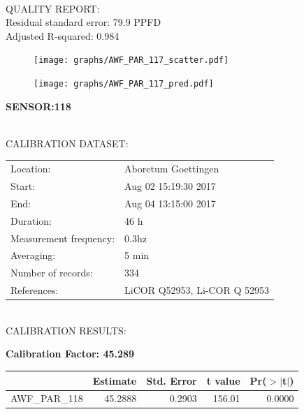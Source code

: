 \documentclass[oneside]{report}
\begin{document}
\hrulefill\\
QUALITY REPORT:\\
Residual standard error: 79.9 PPFD\\
Adjusted R-squared: 0.984



\begin{figure}[H]
  \centering
  \texttt{[image: graphs/AWF\_PAR\_117\_scatter.pdf]}
\end{figure}




\begin{figure}[H]
  \centering
  \texttt{[image: graphs/AWF\_PAR\_117\_pred.pdf]}
\end{figure}

\pagebreak


\begin{center}
\large{\textbf{SENSOR:118}}\\
\end{center}

\hrulefill\\
CALIBRATION DATASET:\\
\begin{table}[h!]
  \centering
  \label{tab:table1}
  \begin{tabular}{ll}
    Location: & Aboretum Goettingen\\ 
    
    
    Start:  & Aug 02 15:19:30 2017 \\
    End:   & Aug 04 13:15:00 2017\\ 
    Duration: & 46 h\\
    Measurement frequency: & 0.3hz\\
    Averaging:  &5 min\\
    Number of records: & 334 \\
    References: & LiCOR Q52953, Li-COR Q 52953 \\
  \end{tabular}
\end{table}

\hrulefill\\
CALIBRATION RESULTS:\\


\begin{center}
\textbf{\large{Calibration Factor: 45.289}}\\
\end{center}
\begin{table}[ht]
\centering
\begin{tabular}{rrrrr}
  \hline
 & Estimate & Std. Error & t value & Pr($>$$|$t$|$) \\ 
  \hline
AWF\_PAR\_118 & 45.2888 & 0.2903 & 156.01 & 0.0000 \\ 
   \hline
\end{tabular}
\end{table}
\end{document}
